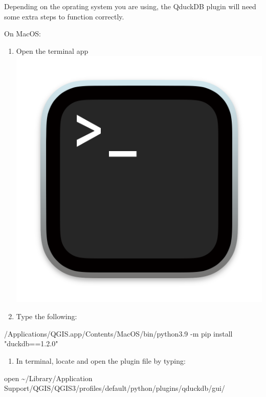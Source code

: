 \documentclass[
  letterpaper,
  DIV=11,
  numbers=noendperiod]{scrartcl}
\newenvironment{Shaded}{\begin{snugshade}}{\end{snugshade}}
\newcommand{\AttributeTok}[1]{\textcolor[rgb]{0.40,0.45,0.13}{#1}}
\newcommand{\ExtensionTok}[1]{\textcolor[rgb]{0.00,0.23,0.31}{#1}}
\newcommand{\NormalTok}[1]{\textcolor[rgb]{0.00,0.23,0.31}{#1}}
\newcommand{\StringTok}[1]{\textcolor[rgb]{0.13,0.47,0.30}{#1}}
\providecommand{\tightlist}{%
  \setlength{\itemsep}{0pt}\setlength{\parskip}{0pt}}\usepackage{longtable,booktabs,array}
\begin{document}
\begin{tcolorbox}[enhanced jigsaw, opacitybacktitle=0.6, colframe=quarto-callout-warning-color-frame, arc=.35mm, leftrule=.75mm, toptitle=1mm, opacityback=0, titlerule=0mm, breakable, colback=white, colbacktitle=quarto-callout-warning-color!10!white, toprule=.15mm, bottomtitle=1mm, coltitle=black, title=\textcolor{quarto-callout-warning-color}{\faExclamationTriangle}\hspace{0.5em}{Warning!}, left=2mm, rightrule=.15mm, bottomrule=.15mm]

Depending on the oprating system you are using, the QduckDB plugin will
need some extra steps to function correctly.

On MacOS:

\begin{enumerate}
\def\labelenumi{\arabic{enumi}.}
\tightlist
\item
  Open the terminal app
  \includegraphics[width=0.06\linewidth,height=\textheight,keepaspectratio]{opengeodata_files/mediabag/Terminalicon2.png}
\item
  Type the following:
\end{enumerate}

\begin{Shaded}
\begin{Highlighting}[]
\ExtensionTok{/Applications/QGIS.app/Contents/MacOS/bin/python3.9} \AttributeTok{{-}m}\NormalTok{ pip install }\StringTok{"duckdb==1.2.0"}
\end{Highlighting}
\end{Shaded}

\begin{enumerate}
\def\labelenumi{\arabic{enumi}.}
\setcounter{enumi}{2}
\tightlist
\item
  In terminal, locate and open the plugin file by typing:
\end{enumerate}

\begin{Shaded}
\begin{Highlighting}[]
\ExtensionTok{open}\NormalTok{ \textasciitilde{}/Library/}\StringTok{\textquotesingle{}Application Support\textquotesingle{}}\NormalTok{/QGIS/QGIS3/profiles/default/python/plugins/qduckdb/gui/}
\end{Highlighting}
\end{Shaded}


\end{tcolorbox}
\end{document}
